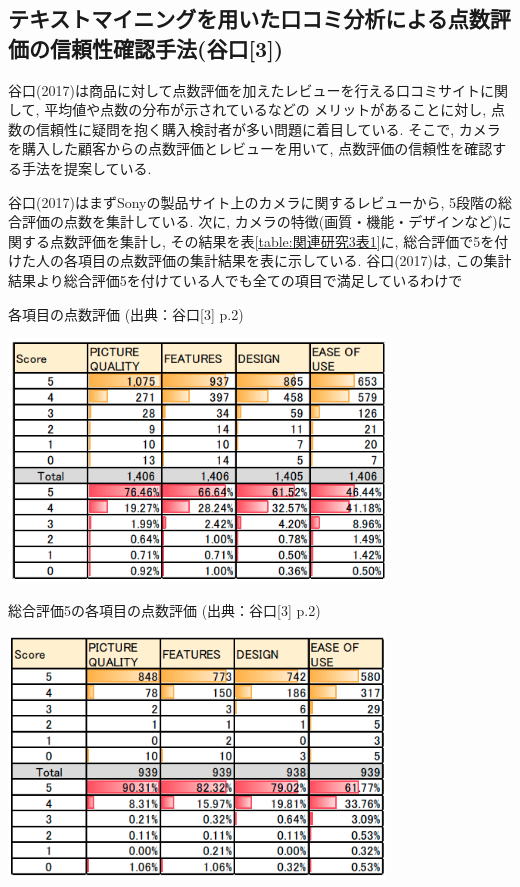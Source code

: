\documentclass{ltjarticle}
\begin{document}
\subsection{テキストマイニングを用いた口コミ分析による点数評価の信頼性確認手法(谷口[3])}
谷口(2017)は商品に対して点数評価を加えたレビューを行える口コミサイトに関して, 平均値や点数の分布が示されているなどの
メリットがあることに対し, 点数の信頼性に疑問を抱く購入検討者が多い問題に着目している. 
そこで, カメラを購入した顧客からの点数評価とレビューを用いて, 点数評価の信頼性を確認する手法を提案している. 

谷口(2017)はまずSonyの製品サイト上のカメラに関するレビューから, 5段階の総合評価の点数を集計している. 
次に, カメラの特徴(画質・機能・デザインなど)に関する点数評価を集計し, その結果を表\ref{table:関連研究3表1}に, 
総合評価で5を付けた人の各項目の点数評価の集計結果を表に示している. 
谷口(2017)は, この集計結果より総合評価5を付けている人でも全ての項目で満足しているわけで

\begin{table}[h]
    \centering
    \caption{各項目の点数評価 (出典：谷口[3] p.2)}
    \vspace{5truept}
    \includegraphics[width = 10cm]{images/関連研究3表1.png}
    \label{table:関連研究3表1}
\end{table}
\vspace{20truept}

\newpage
\begin{table}[h]
    \centering
    \caption{総合評価5の各項目の点数評価 (出典：谷口[3] p.2)}
    \vspace{5truept}
    \includegraphics[width = 10cm]{images/関連研究3表2.png}
    \label{table:関連研究3表2}
\end{table}
\vspace*{20truept}
\end{document}
